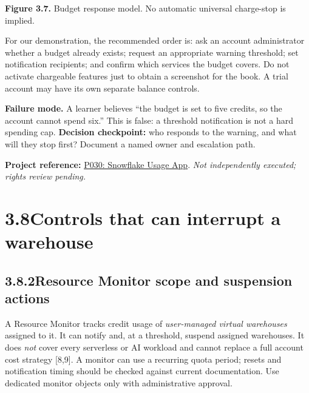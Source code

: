 \documentclass[11pt,twoside]{article}
\newcommand{\topic}[2]{\subsection*{#1\quad #2}}
\newcommand{\repo}[2]{\par\begingroup\fontsize{8.0}{9.6}\selectfont\sffamily\color{inkgray}\textbf{Project reference:} \href{#2}{#1}. \textit{Not independently executed; rights review pending.}\par\endgroup}
\begin{document}
\begin{center}
\end{center}
{\small\color{inkgray}\textbf{Figure 3.7.} Budget response model. No automatic universal charge-stop is implied.}\par
For our demonstration, the recommended order is: ask an account administrator whether a budget already exists; request an appropriate warning threshold; set notification recipients; and confirm which services the budget covers. Do not activate chargeable features just to obtain a screenshot for the book. A trial account may have its own separate balance controls.

\textbf{Failure mode.} A learner believes ``the budget is set to five credits, so the account cannot spend six.'' This is false: a threshold notification is not a hard spending cap. \textbf{Decision checkpoint:} who responds to the warning, and what will they stop first? Document a named owner and escalation path.
\repo{P030: Snowflake Usage App}{https://github.com/streamlit/snowflake-usage-app}

\newpage
\section*{3.8\quad Controls that can interrupt a warehouse}
\topic{3.8.2}{Resource Monitor scope and suspension actions}
A Resource Monitor tracks credit usage of \emph{user-managed virtual warehouses} assigned to it. It can notify and, at a threshold, suspend assigned warehouses. It does \emph{not} cover every serverless or AI workload and cannot replace a full account cost strategy [8,9]. A monitor can use a recurring quota period; resets and notification timing should be checked against current documentation. Use dedicated monitor objects only with administrative approval.
\end{document}
